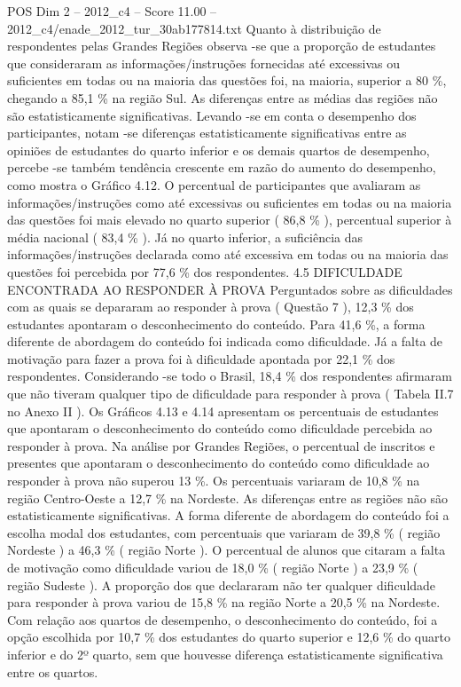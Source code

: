 \begin{textsample}{POS Dim 2 – 2012\_c4 – Score 11.00 – 2012\_c4/enade\_2012\_tur\_30ab177814.txt}
Quanto à distribuição de respondentes pelas Grandes Regiões observa -se que a proporção de estudantes que consideraram as informações/instruções fornecidas até excessivas ou suficientes em todas ou na maioria das questões foi, na maioria, superior a 80 \%, chegando a 85,1 \% na região Sul.
As diferenças entre as médias das regiões não são estatisticamente significativas.
Levando -se em conta o desempenho dos participantes, notam -se diferenças estatisticamente significativas entre as opiniões de estudantes do quarto inferior e os demais quartos de desempenho, percebe -se também tendência crescente em razão do aumento do desempenho, como mostra o Gráfico 4.12.
O percentual de participantes que avaliaram as informações/instruções como até excessivas ou suficientes em todas ou na maioria das questões foi mais elevado no quarto superior ( 86,8 \% ), percentual superior à média nacional ( 83,4 \% ).
Já no quarto inferior, a suficiência das informações/instruções declarada como até excessiva em todas ou na maioria das questões foi percebida por 77,6 \% dos respondentes. 4.5 DIFICULDADE ENCONTRADA AO RESPONDER À PROVA Perguntados sobre as dificuldades com as quais se depararam ao responder à prova ( Questão 7 ), 12,3 \% dos estudantes apontaram o desconhecimento do conteúdo.
Para 41,6 \%, a forma diferente de abordagem do conteúdo foi indicada como dificuldade.
Já a falta de motivação para fazer a prova foi à dificuldade apontada por 22,1 \% dos respondentes.
Considerando -se todo o Brasil, 18,4 \% dos respondentes afirmaram que não tiveram qualquer tipo de dificuldade para responder à prova ( Tabela II.7 no Anexo II ).
Os Gráficos 4.13 e 4.14 apresentam os percentuais de estudantes que apontaram o desconhecimento do conteúdo como dificuldade percebida ao responder à prova.
Na análise por Grandes Regiões, o percentual de inscritos e presentes que apontaram o desconhecimento do conteúdo como dificuldade ao responder à prova não superou 13 \%.
Os percentuais variaram de 10,8 \% na região Centro-Oeste a 12,7 \% na Nordeste.
As diferenças entre as regiões não são estatisticamente significativas.
A forma diferente de abordagem do conteúdo foi a escolha modal dos estudantes, com percentuais que variaram de 39,8 \% ( região Nordeste ) a 46,3 \% ( região Norte ).
O percentual de alunos que citaram a falta de motivação como dificuldade variou de 18,0 \% ( região Norte ) a 23,9 \% ( região Sudeste ).
A proporção dos que declararam não ter qualquer dificuldade para responder à prova variou de 15,8 \% na região Norte a 20,5 \% na Nordeste.
Com relação aos quartos de desempenho, o desconhecimento do conteúdo, foi a opção escolhida por 10,7 \% dos estudantes do quarto superior e 12,6 \% do quarto inferior e do 2º quarto, sem que houvesse diferença estatisticamente significativa entre os quartos.

\end{textsample}

